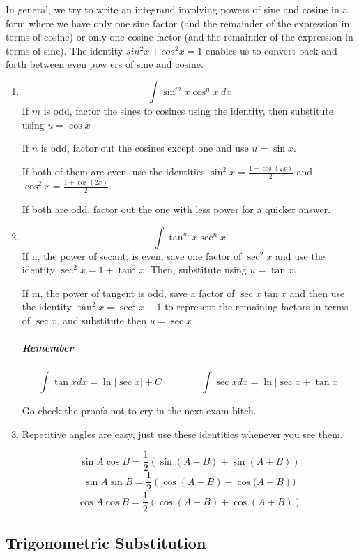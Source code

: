 \documentclass{article}
\begin{document}
	In general, we try to write an integrand involving powers of sine and cosine in a form
	where we have only one sine factor (and the remainder of the expression in terms of
	cosine) or only one cosine factor (and the remainder of the expression in terms of sine).
	The iden­tity $sin^2x+ cos^2x = 1$ enables us to convert back and forth between even pow­
	ers of sine and cosine.
	\begin{enumerate}[1.]
		\item \[ \int \sin^m{ x } \cos^n{ x } \ dx 
			\]
			If $ m $ is odd, factor the sines to cosines using the identity, then substitute using $ u= \cos{ x }  $

			If $ n $ is odd, factor out the cosines except one and use $ u= \sin{ x }  $. 

			If both of them are even, use the identities $ \sin^2{x} = \frac{ 1- \cos{ (2x) }  }{ 2 }  $ and $ \cos^2x = \frac{ 1+ \cos(2x) }{ 2 }  $.

			If both are odd, factor out the one with less power for a quicker answer.

		\item \[
				\int \tan^mx \sec^nx 
			\]
			If n, the power of secant, is even, save one factor of $ \sec^2x $ and use the identity $ \sec^2x=1+\tan^2x $. Then, substitute using $ u = \tan{ x }  $. 

			If m, the power of tangent is odd, save a factor of $ \sec x \tan{ x } $ and then use the identity $ \tan^2{ x } = \sec^2x-1  $ to represent the remaining factors in terms of $ \sec x $, and substitute then $ u = \sec x $ 

			\subparagraph{Remember}
			\[ \int \tan{ x } dx = \ln{|\sec x|} + C \qquad \qquad \int \sec x dx = \ln {|\sec x + \tan{ x } |} \]

			Go check the proofs not to cry in the next exam bitch.

		\item Repetitive angles are easy, just use these identities whenever you see them.

			\[
				\sin{ A } \cos{ B } = \frac{1}{2} ( \sin{( A-B )} + \sin{( A+B )}   ) 
			\]
			\[
				\sin{ A } \sin{ B } = \frac{1}{2} ( \cos{( A-B )} - \cos{( A+B }   ))
			\]
			\[
				\cos{ A } \cos{ B } = \frac{1}{2} ( \cos{ (A-B) } + \cos{ (A+B) }   )
			\]

	\end{enumerate}

	\newpage
	\subsection{Trigonometric Substitution}
\end{document}
